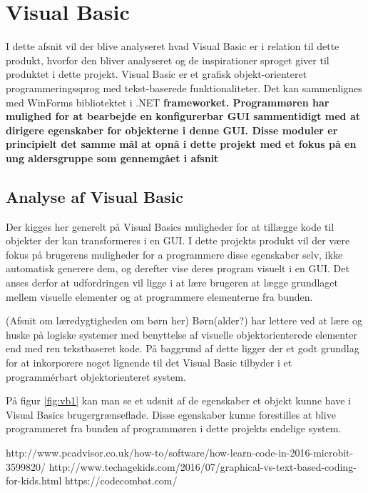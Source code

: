 \section{Visual Basic}

I dette afsnit vil der blive analyseret hvad Visual Basic er i relation til dette produkt, hvorfor den bliver analyseret og de inspirationer sproget giver til produktet i dette projekt.
Visual Basic er et grafisk objekt-orienteret programmeringssprog med tekst-baserede funktionaliteter. Det kan sammenlignes med WinForms bibliotektet i .NET \bf{frameworket}. Programmøren har mulighed for at bearbejde en konfigurerbar GUI sammentidigt med at dirigere egenskaber for objekterne i denne GUI. Disse moduler er principielt det samme mål at opnå i dette projekt med et fokus på en ung aldersgruppe som gennemgået i afsnit 

\subsection{Analyse af Visual Basic}

Der kigges her generelt på Visual Basics muligheder for at tillægge kode til objekter der kan transformeres i en GUI. I dette projekts produkt vil der være fokus på brugerens muligheder for a programmere disse egenskaber selv, ikke automatisk generere dem, og derefter vise deres program visuelt i en GUI. Det anses derfor at udfordringen vil ligge i at lære brugeren at lægge grundlaget mellem visuelle elementer og at programmere elementerne fra bunden.

(Afsnit om læredygtigheden om børn her)
Børn(alder?) har lettere ved at lære og huske på logiske systemer med benyttelse af visuelle objektorienterede elementer end med ren tekstbaseret kode\cite{techagekids}. På baggrund af dette ligger der et godt grundlag for at inkorporere noget lignende til det Visual Basic tilbyder i et programmérbart objektorienteret system.


På figur \ref{fig:vb1} kan man se et udsnit af de egenskaber et objekt kunne have i Visual Basics brugergrænseflade. Disse egenskaber kunne forestilles at blive programmeret fra bunden af programmøren i dette projekts endelige system.

http://www.pcadvisor.co.uk/how-to/software/how-learn-code-in-2016-microbit-3599820/
http://www.techagekids.com/2016/07/graphical-vs-text-based-coding-for-kids.html
https://codecombat.com/